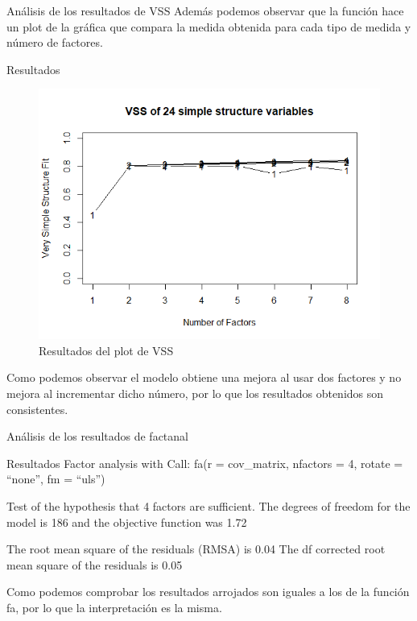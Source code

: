 \documentclass[10pt]{beamer}
\begin{document}
\begin{frame}[fragile]{Análisis de los resultados de VSS}
Además podemos observar que la función hace un plot de la gráfica que compara la medida obtenida para cada tipo de medida y número de factores.
\begin{alertblock}{Resultados}
	\begin{figure}
		\includegraphics[scale=0.25]{./Imagenes/res_vss2.png}
		\caption{Resultados del plot de VSS}
	\end{figure}
	Como podemos observar el modelo obtiene una mejora al usar dos factores y no mejora al incrementar dicho número, por lo que los resultados obtenidos son consistentes.
\end{alertblock}
\end{frame}

\begin{frame}[fragile]{Análisis de los resultados de factanal}
\begin{alertblock}{Resultados}
	Factor analysis with Call: fa(r = cov\_matrix, nfactors = 4, rotate = ``none'', fm = ``uls'')
	
	Test of the hypothesis that 4 factors are sufficient.
	The degrees of freedom for the model is 186  and the objective function was  1.72 
	
	The root mean square of the residuals (RMSA) is  0.04 
	The df corrected root mean square of the residuals is  0.05 
	
	Como podemos comprobar los resultados arrojados son iguales a los de la función fa, por lo que la interpretación es la misma.
\end{alertblock}
\end{frame}
\end{document}
